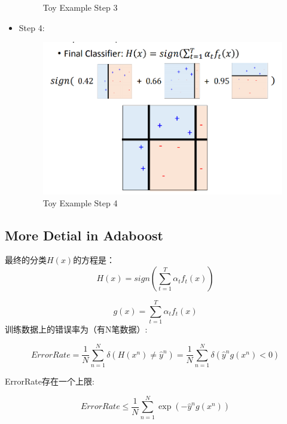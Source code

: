 \begin{itemize}
\begin{figure}[H]
        \caption{Toy Example Step 3}
    \end{figure}
    \item Step 4:
    \\
    \begin{figure}[H]
        \centerline{\includegraphics[scale=0.3]{Part1/Chapter/images/toyexample4.png}}
        \caption{Toy Example Step 4}
    \end{figure}
\end{itemize}

\subsection{More Detial in Adaboost}

最终的分类$H(x)$的方程是：
\begin{equation*}
    H(x) = sign(\sum_{t=1}^T \alpha_t f_t(x))
\end{equation*}

\begin{equation*}
    g(x) = \sum_{t=1}^T \alpha_t f_t(x)
\end{equation*}
训练数据上的错误率为（有N笔数据）:

\begin{equation*}
    Error Rate = \frac{1}{N} \sum_{n=1}^N \delta(H(x^n) \neq \hat{y}^n)
    = \frac{1}{N} \sum_{n=1}^N \delta(\hat{y}^n g(x^n) < 0)
\end{equation*}

ErrorRate存在一个上限:


\begin{equation*}
    Error Rate \leq \frac{1}{N} \sum_{n=1}^N  \exp(-\hat{y}^n g(x^n))
\end{equation*}


